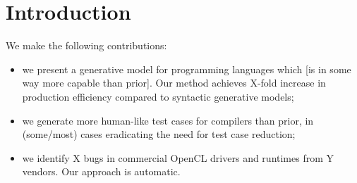 \section{Introduction}\label{sec:intro}

 We make the following contributions:
%
\begin{itemize}
\item we present a generative model for programming languages which [is in some way more capable than prior]. Our method achieves X-fold increase in production efficiency compared to syntactic generative models;
\item we generate more human-like test cases for compilers than prior, in (some/most) cases eradicating the need for test case reduction;
\item we identify X bugs in commercial OpenCL drivers and runtimes from Y vendors. Our approach is automatic.
\end{itemize}
